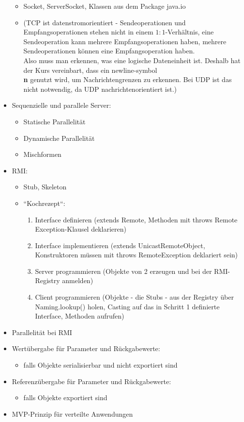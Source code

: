 \begin{itemize}
    \begin{itemize}
        \item Socket, ServerSocket, Klassen aus dem Package java.io
        \item[] (TCP ist datenstromorientiert - Sendeoperationen und Empfangsoperationen stehen nicht in einem $1:1$-Verhältnis, eine Sendeoperation kann mehrere Empfangsoperationen haben, mehrere Sendeoperationen können eine Empfangsoperation haben.\\
        Also muss man erkennen, was eine logische Dateneinheit ist.
        Deshalb hat der Kurs vereinbart, dass ein newline-symbol \textbf{\\n} genutzt wird, um Nachrichtengrenzen zu erkennen.
        Bei UDP ist das nicht notwendig, da UDP nachrichtenorientiert ist.)
    \end{itemize}
    \item Sequenzielle und parallele Server:
    \begin{itemize}
        \item Statische Parallelität
        \item Dynamische Parallelität
        \item Mischformen
    \end{itemize}
    \item RMI:
    \begin{itemize}
        \item Stub, Skeleton
        \item ``Kochrezept``:
        \begin{enumerate}
            \item Interface definieren (extends Remote, Methoden mit throws Remote Exception-Klausel deklarieren)
            \item Interface implementieren (extends UnicastRemoteObject, Konstruktoren müssen mit throws RemoteException deklariert sein)
            \item Server programmieren (Objekte von 2 erzeugen und bei der RMI-Registry anmelden)
            \item Client programmieren (Objekte - die Stubs - aus der Registry über Naming.lookup() holen, Casting auf das in Schritt 1 definierte Interface, Methoden aufrufen)
        \end{enumerate}
    \end{itemize}
    \item Parallelität bei RMI
    \item Wertübergabe für Parameter und Rückgabewerte:
    \begin{itemize}
        \item falls Objekte serialisierbar und nicht exportiert sind
    \end{itemize}
    \item Referenzübergabe für Parameter und Rückgabewerte:
    \begin{itemize}
        \item falls Objekte exportiert sind
    \end{itemize}
    \item MVP-Prinzip für verteilte Anwendungen
\end{itemize}

